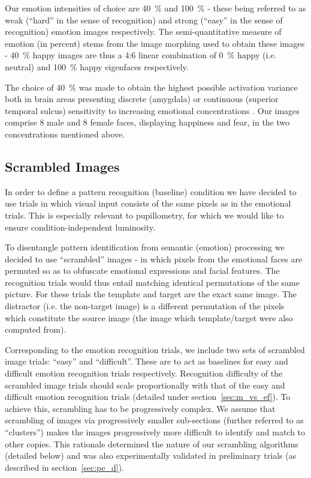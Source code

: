 	    Our emotion intensities of choice are \SI{40}{\percent} and \SI{100}{\percent} - these being referred to as weak (“hard” in the sense of recognition) and strong (“easy” in the sense of recognition) emotion images respectively.
	    The semi-quantitative measure of emotion (in percent) stems from the image morphing used to obtain these images - \SI{40}{\percent} happy images are thus a 4:6 linear combination of \SI{0}{\percent} happy (i.e. neutral) and \SI{100}{\percent} happy eigenfaces \citep{Zhang2008} respectively.
	    
	    The choice of \SI{40}{\percent} was made to obtain the highest possible activation variance both in brain areas presenting discrete (amygdala) or continuous (superior temporal sulcus) sensitivity to increasing emotional concentrations \citep{Harris2012}.
	    Our images comprise 8 male and 8 female faces, displaying happiness and fear, in the two concentrations mentioned above. 
	\subsection{Scrambled Images}\label{sec:m_vs_si}
	    In order to define a pattern recognition (baseline) condition we have decided to use trials in which visual input consists of the same pixels as in the emotional trials.
	    This is especially relevant to pupillometry, for which we would like to ensure condition-independent luminosity.
	    
	    To disentangle pattern identification from semantic (emotion) processing we decided to use “scrambled” images - in which pixels from the emotional faces are permuted so as to obfuscate emotional expressions and facial features.
	    The recognition trials would thus entail matching identical permutations of the same picture.
	    For these trials the template and target are the exact same image.
	    The distractor (i.e. the non-target image) is a different permutation of the pixels which constitute the source image (the image which template/target were also computed from). 
	    
	    Corresponding to the emotion recognition trials, we include two sets of scrambled image trials: “easy” and “difficult”.
	    These are to act as baselines for easy and difficult emotion recognition trials respectively.
	    Recognition difficulty of the scrambled image trials should scale proportionally with that of the easy and difficult emotion recognition trials (detailed under section~\ref{sec:m_vs_ef}).
	    To achieve this, scrambling has to be progressively complex.
	    We assume that scrambling of images via progressively smaller sub-sections (further referred to as “clusters”) makes the images progressively more difficult to identify and match to other copies.
	    This rationale determined the nature of our scrambling algorithms (detailed below) and was also experimentally validated in preliminary trials (as described in section~\ref{sec:pe_d}).
	    
